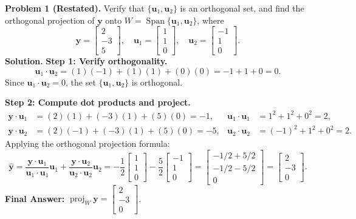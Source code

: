 \documentclass[11pt, letterpaper]{article}
\theoremstyle{definition}
\theoremstyle{remark}
\begin{document}
\textbf{Problem 1 (Restated).} Verify that $\{\mathbf{u}_1, \mathbf{u}_2\}$ is an orthogonal set, and find the orthogonal projection of $\mathbf{y}$ onto $W = \operatorname{Span}\{\mathbf{u}_1, \mathbf{u}_2\}$, where
\[
\mathbf{y} = \begin{bmatrix} 2 \\ -3 \\ 5 \end{bmatrix}, \quad \mathbf{u}_1 = \begin{bmatrix} 1 \\ 1 \\ 0 \end{bmatrix}, \quad \mathbf{u}_2 = \begin{bmatrix} -1 \\ 1 \\ 0 \end{bmatrix}.
\]
\textbf{Solution.}
\textbf{Step 1: Verify orthogonality.}
\[
\mathbf{u}_1 \cdot \mathbf{u}_2 = (1)(-1) + (1)(1) + (0)(0) = -1 + 1 + 0 = 0.
\]
Since $\mathbf{u}_1 \cdot \mathbf{u}_2 = 0$, the set $\{\mathbf{u}_1, \mathbf{u}_2\}$ is orthogonal.

\textbf{Step 2: Compute dot products and project.}
\begin{align*}
\mathbf{y} \cdot \mathbf{u}_1 &= (2)(1) + (-3)(1) + (5)(0) = -1, & \mathbf{u}_1 \cdot \mathbf{u}_1 &= 1^2 + 1^2 + 0^2 = 2, \\
\mathbf{y} \cdot \mathbf{u}_2 &= (2)(-1) + (-3)(1) + (5)(0) = -5, & \mathbf{u}_2 \cdot \mathbf{u}_2 &= (-1)^2 + 1^2 + 0^2 = 2.
\end{align*}
Applying the orthogonal projection formula:
\[
\hat{\mathbf{y}} = \frac{\mathbf{y}\cdot\mathbf{u}_1}{\mathbf{u}_1\cdot\mathbf{u}_1}\mathbf{u}_1 + \frac{\mathbf{y}\cdot\mathbf{u}_2}{\mathbf{u}_2\cdot\mathbf{u}_2}\mathbf{u}_2 = -\frac{1}{2}\begin{bmatrix} 1 \\ 1 \\ 0 \end{bmatrix} - \frac{5}{2}\begin{bmatrix} -1 \\ 1 \\ 0 \end{bmatrix} = \begin{bmatrix} -1/2 + 5/2 \\ -1/2 - 5/2 \\ 0 \end{bmatrix} = \begin{bmatrix} 2 \\ -3 \\ 0 \end{bmatrix}.
\]
\textbf{Final Answer:} $\operatorname{proj}_W \mathbf{y} = \begin{bmatrix} 2 \\ -3 \\ 0 \end{bmatrix}$.
\end{document}
